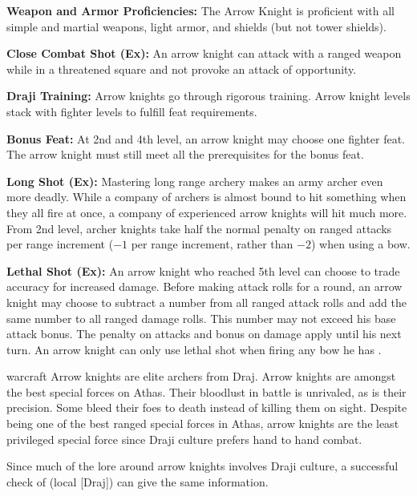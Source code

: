 {
\textbf{Weapon and Armor Proficiencies:} The Arrow Knight is proficient with all simple and martial weapons, light armor, and shields (but not tower shields).

\textbf{Close Combat Shot (Ex):} An arrow knight can attack with a ranged weapon while in a threatened square and not provoke an attack of opportunity.

\textbf{Draji Training:} Arrow knights go through rigorous training. Arrow knight levels stack with fighter levels to fulfill feat requirements. %

\textbf{Bonus Feat:} At 2nd and 4th level, an arrow knight may choose one fighter feat. The arrow knight must still meet all the prerequisites for the bonus feat.

\textbf{Long Shot (Ex):} Mastering long range archery makes an army archer even more deadly. While a company of archers is almost bound to hit something when they all fire at once, a company of experienced arrow knights will hit much more. From 2nd level, archer knights take half the normal penalty on ranged attacks per range increment ($-1$ per range increment, rather than $-2$) when using a bow.



\textbf{Lethal Shot (Ex):} An arrow knight who reached 5th level can choose to trade accuracy for increased damage. Before making attack rolls for a round, an arrow knight may choose to subtract a number from all ranged attack rolls and add the same number to all ranged damage rolls. This number may not exceed his base attack bonus. The penalty on attacks and bonus on damage apply until his next turn. An arrow knight can only use lethal shot when firing any bow he has .
}
{}
{warcraft}
{Arrow knights are elite archers from Draj.}
{Arrow knights are amongst the best special forces on Athas. Their bloodlust in battle is unrivaled, as is their precision. Some bleed their foes to death instead of killing them on sight.}
{Despite being one of the best ranged special forces in Athas, arrow knights are the least privileged special force since Draji culture prefers hand to hand combat.}

Since much of the lore around arrow knights involves Draji culture, a successful check of  (local [Draj]) can give the same information.